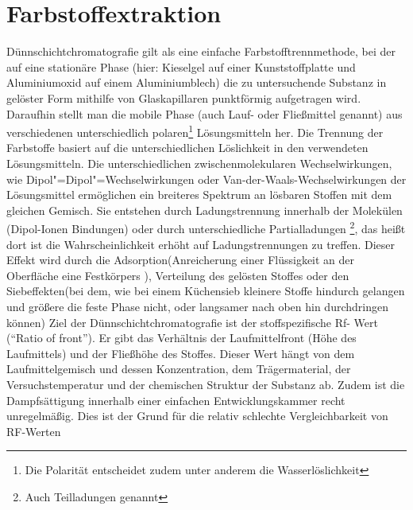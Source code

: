 \documentclass[11pt]{scrreprt}
\begin{document}
\chapter{Farbstoffextraktion}
Dünnschichtchromatografie gilt als eine einfache Farbstofftrennmethode, bei der auf eine stationäre Phase (hier: Kieselgel auf einer Kunststoffplatte und Aluminiumoxid auf einem Aluminiumblech) die zu untersuchende Substanz in gelöster Form mithilfe von Glaskapillaren punktförmig aufgetragen wird.  Daraufhin stellt man die mobile Phase (auch Lauf- oder Fließmittel genannt) aus verschiedenen unterschiedlich polaren\footnote{Die Polarität entscheidet zudem unter anderem die Wasserlöslichkeit} Lösungsmitteln her. Die Trennung der Farbstoffe basiert auf die unterschiedlichen Löslichkeit in den verwendeten Lösungsmitteln.
Die unterschiedlichen zwischenmolekularen Wechselwirkungen, wie Dipol"=Dipol"=Wechselwirkungen oder Van-der-Waals-Wechselwirkungen der Lösungsmittel ermöglichen ein breiteres Spektrum an lösbaren Stoffen mit dem gleichen Gemisch. Sie entstehen durch Ladungstrennung innerhalb der Molekülen (Dipol-Ionen Bindungen) oder durch unterschiedliche Partialladungen \footnote{Auch Teilladungen genannt}, das heißt dort ist die Wahrscheinlichkeit erhöht auf Ladungstrennungen zu treffen. Dieser Effekt wird durch die Adsorption(Anreicherung einer Flüssigkeit an der Oberfläche eine Festkörpers ), Verteilung des gelösten Stoffes oder den Siebeffekten(bei dem, wie bei einem Küchensieb kleinere Stoffe hindurch gelangen und größere die feste Phase nicht, oder langsamer nach oben hin durchdringen können)
Ziel der Dünnschichtchromatografie ist der stoffspezifische Rf- Wert (\enquote{Ratio of front}). Er gibt das Verhältnis der Laufmittelfront (Höhe des Laufmittels) und der Fließhöhe des Stoffes. Dieser Wert hängt von dem Laufmittelgemisch und dessen Konzentration, dem Trägermaterial, der Versuchstemperatur und der chemischen Struktur der Substanz ab. Zudem ist die Dampfsättigung innerhalb einer einfachen Entwicklungskammer recht unregelmäßig. Dies ist der Grund für die relativ schlechte Vergleichbarkeit von RF-Werten
 
\end{document}
